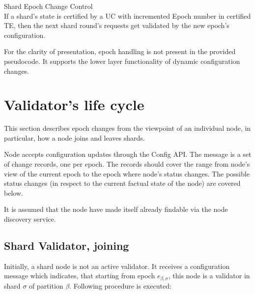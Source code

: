 \begin{ruledef*}{Shard Epoch Change Control} \\
  If a shard's state is certified by a UC with incremented Epoch number in certified TE, then the next shard round's requests get validated by the new epoch's configuration.
\end{ruledef*}

For the clarity of presentation, epoch handling is not present in the provided pseudocode. It supports the lower layer functionality of dynamic configuration changes.


\section{Validator's life cycle}

This section describes epoch changes from the viewpoint of an individual node, in particular, how a node joins and leaves shards.

Node accepts configuration updates through the Config API. The message is a set of change records, one per epoch. The records should cover the range from node's view of the current epoch to the epoch where node's status changes. The possible status changes (in respect to the current factual state of the node) are covered below.

It is assumed that the node have made itself already findable via the node discovery service.

\subsection{Shard Validator, joining} \label{sec:shard-node-joining}

Initially, a shard node is not an active validator. It receives a configuration message which indicates, that starting from epoch $e_{\beta, \sigma}$, this node is a validator in shard $\sigma$ of partition $\beta$. Following procedure is executed:

